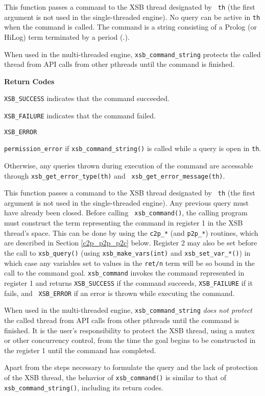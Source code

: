 \begin{description}
%
This function passes a command to the XSB thread designated by {\tt
  th} (the first argument is not used in the single-threaded engine).
No query can be active in {\tt th} when the command is called.  The
command is a string consisting of a Prolog (or HiLog) term terminated
by a period (.).

When used in the multi-threaded engine, {\tt xsb\_command\_string}
protects the called thread from API calls from other pthreads until
the command is finished.

{\bf Return Codes}  
\bi
\item {\tt XSB\_SUCCESS} indicates that the command succeeded.
%
\item {\tt XSB\_FAILURE} indicates that the command failed.
%
\item {\tt XSB\_ERROR} 
\bi
\item {\tt permission\_error} if {\tt xsb\_command\_string()} is
  called while a query is open in {\tt th}.
%
\item Otherwise, any queries thrown during execution of the command
  are accessable through {\tt xsb\_get\_error\_type(th)} and {\tt
    xsb\_get\_error\_message(th)}.
\ei
%
\ei

 
%
This function passes a command to the XSB thread designated by {\tt
  th} (the first argument is not used in the single-threaded engine).
Any previous query must have already been closed.  Before calling {\tt
  xsb\_command()}, the calling program must construct the term
representing the command in register 1 in the XSB thread's space.
This can be done by using the {\tt c2p\_*} (and {\tt p2p\_*})
routines, which are described in Section \ref{c2p_p2p_p2c} below.
Register 2 may also be set before the call to {\tt xsb\_query()}
(using {\tt xsb\_make\_vars(int)} and {\tt xsb\_set\_var\_*()}) in
which case any variables set to values in the {\tt ret/n} term will be
so bound in the call to the command goal.  {\tt xsb\_command} invokes
the command represented in register 1 and returns {\tt XSB\_SUCCESS}
if the command succeeds, {\tt XSB\_FAILURE} if it fails, and {\tt
  XSB\_ERROR} if an error is thrown while executing the command.

When used in the multi-threaded engine, {\tt xsb\_command\_string}
{\em does not protect} the called thread from API calls from other
pthreads until the command is finished.  It is the user's
responsibility to protect the XSB thread, using a mutex or other
concurrency control, from the time the goal begins to be constructed
in the register 1 until the command has completed.

Apart from the steps necessary to formulate the query and the lack of
protection of the XSB thread, the behavior of {\tt xsb\_command()} is
similar to that of {\tt xsb\_command\_string()}, including its return
codes.
\end{description}

